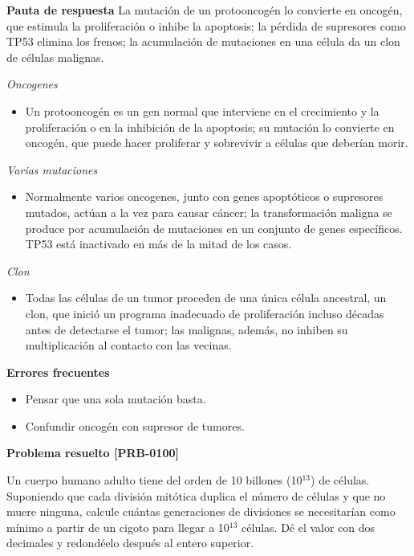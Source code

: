 \documentclass{book}
\begin{document}
\noindent\textbf{Pauta de respuesta}
La mutación de un protooncogén lo convierte en oncogén, que estimula la proliferación o inhibe la apoptosis; la pérdida de supresores como TP53 elimina los frenos; la acumulación de mutaciones en una célula da un clon de células malignas.


\noindent\textit{Oncogenes}
\begin{itemize}
\item Un protooncogén es un gen normal que interviene en el crecimiento y la proliferación o en la inhibición de la apoptosis; su mutación lo convierte en oncogén, que puede hacer proliferar y sobrevivir a células que deberían morir.
\end{itemize}

\noindent\textit{Varias mutaciones}
\begin{itemize}
\item Normalmente varios oncogenes, junto con genes apoptóticos o supresores mutados, actúan a la vez para causar cáncer; la transformación maligna se produce por acumulación de mutaciones en un conjunto de genes específicos. TP53 está inactivado en más de la mitad de los casos.
\end{itemize}

\noindent\textit{Clon}
\begin{itemize}
\item Todas las células de un tumor proceden de una única célula ancestral, un clon, que inició un programa inadecuado de proliferación incluso décadas antes de detectarse el tumor; las malignas, además, no inhiben su multiplicación al contacto con las vecinas.
\end{itemize}

\noindent\textbf{Errores frecuentes}
\begin{itemize}
\item Pensar que una sola mutación basta.
\item Confundir oncogén con supresor de tumores.
\end{itemize}

\noindent\textbf{Problema resuelto [PRB-0100]}

Un cuerpo humano adulto tiene del orden de 10 billones (10\({}^{13}\)) de células. Suponiendo que cada división mitótica duplica el número de células y que no muere ninguna, calcule cuántas generaciones de divisiones se necesitarían como mínimo a partir de un cigoto para llegar a 10\({}^{13}\) células. Dé el valor con dos decimales y redondéelo después al entero superior.
\end{document}
